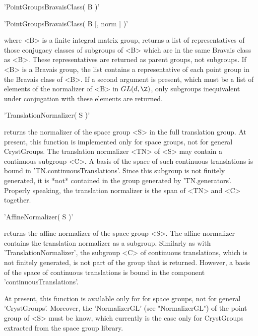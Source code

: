 
'PointGroupsBravaisClass( B )'

'PointGroupsBravaisClass( B [, norm ] )'

where  <B> is   a  finite  integral matrix  group,   returns  a  list  of
representatives of those conjugacy classes  of subgroups of <B> which are
in the same Bravais class  as <B>. These  representatives are returned as
parent groups, not   subgroups.  If  <B>  is a  Bravais   group, the list
contains a  representative of  each point  group in the  Bravais class of
<B>. If a second argument is present, which must be a list of elements of
the normalizer  of <B> in  $GL(d,\Z)$, only  subgroups inequivalent under
conjugation with these elements are returned.

%

'TranslationNormalizer( S )'

returns the normalizer  of the space group  <S>  in the  full translation
group. At present,  this function is  implemented only  for space groups,
not for general  CrystGroups.  The translation normalizer <TN> of <S> may
contain   a  continuous subgroup  <C>.  A  basis  of  the  space  of such
continuous translations  is bound  in 'TN.continuousTranslations'.  Since
this subgroup is  not finitely generated,   it is *not* contained in  the
group  generated by  'TN.generators'. Properly  speaking, the translation
normalizer is the span of <TN> and <C> together.

%

'AffineNormalizer( S )'

returns   the  affine normalizer of    the space group   <S>.  The affine
normalizer contains the translation  normalizer as a subgroup.  Similarly
as  with   'TranslationNormalizer',   the  subgroup  <C>   of  continuous
translations, which  is not finitely generated,  is not part of the group
that  is  returned.   However,  a   basis of  the    space of  continuous
translations is bound in the component 'continuousTranslations'.

At present, this function is available only for for space groups, not for
general 'CrystGroups'.  Moreover, the 'NormalizerGL' (see "NormalizerGL")
of the point group of <S> must be know, which currently  is the case only
for CrystGroups  extracted from the  space  group library.


